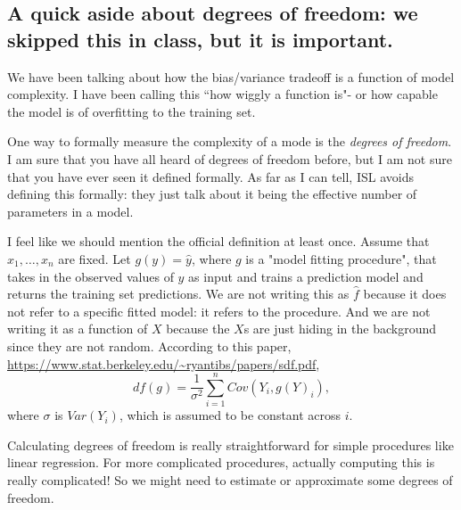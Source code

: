 \subsection{A quick aside about degrees of freedom: we skipped this in class, but it is important.}

We have been talking about how the bias/variance tradeoff is a function of model complexity. I have been calling this ``how wiggly a function is"- or how capable the model is of overfitting to the training set. 

One way to formally measure the complexity of a mode is the \emph{degrees of freedom}. I am sure that you have all heard of degrees of freedom before, but I am not sure that you have ever seen it defined formally. As far as I can tell, ISL avoids defining this formally: they just talk about it being the effective number of parameters in a model. 

I feel like we should mention the official definition at least once. Assume that $x_1,\ldots,x_n$ are fixed. Let $g(y) = \hat{y}$, where $g$ is a "model fitting procedure", that takes in the observed values of $y$ as input and trains a prediction model and returns the training set predictions. We are not writing this as $\hat{f}$ because it does not refer to a specific fitted model: it refers to the procedure. And we are not writing it as a function of $X$ because the $X$s are just hiding in the background since they are not random. According to this paper, \url{https://www.stat.berkeley.edu/~ryantibs/papers/sdf.pdf}, 
$$
df(g) = \frac{1}{\sigma^2} \sum_{i=1}^n Cov(Y_i, g(Y)_i),
$$
where $\sigma$ is $Var(Y_i)$, which is assumed to be constant across $i$. 

Calculating degrees of freedom is really straightforward for simple procedures like linear regression. For more complicated procedures, actually computing this is really complicated! So we might need to estimate or approximate some degrees of freedom. 

